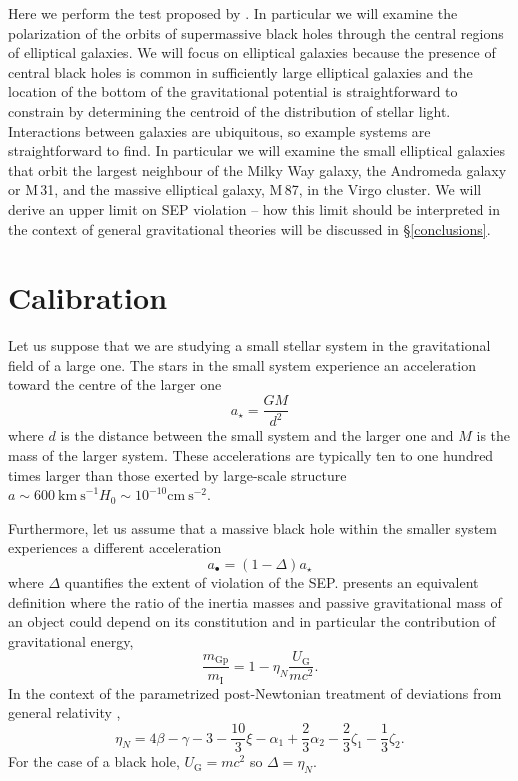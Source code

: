 \documentclass[useAMS,usenatbib]{mn2e}
\begin{document}
Here we perform the test proposed by \cite{2012PhRvL.109e1304H}.
In particular we will examine the polarization of the orbits of
supermassive black holes through the central regions of elliptical
galaxies.  We will focus on elliptical galaxies because the presence
of central black holes is common in sufficiently large elliptical
galaxies and the location of the bottom of the gravitational potential
is straightforward to constrain by determining the centroid of the
distribution of stellar light.  Interactions between galaxies are
ubiquitous, so example systems are straightforward to find.  In
particular we will examine the small elliptical galaxies that orbit
the largest neighbour of the Milky Way galaxy, the Andromeda galaxy or
M\,31, and the massive elliptical galaxy, M\,87, in the Virgo cluster.
We will derive an upper limit on SEP violation -- how this limit
should be interpreted in the context of general gravitational theories
will be discussed in \S \ref{conclusions}.

\section{Calibration}

Let us suppose that we are studying a small stellar system in the
gravitational field of a large one.  The stars in the small system
experience an acceleration toward the centre of the larger one
\begin{equation}
  a_\star = \frac{GM}{d^2}
  \label{eq:1}
\end{equation}
where $d$ is the distance between the small system and the larger one
and $M$ is the mass of the larger system.  These accelerations are
typically ten to one hundred times larger than those exerted by
large-scale structure $a \sim 600~\mathrm{km~s}^{-1} H_0 \sim 10^{-10}
\mathrm{cm~s}^{-2}$.

Furthermore, let us assume that a massive black hole within the
smaller system experiences a different acceleration
\begin{equation}
  a_\bullet = \left ( 1 - \Delta \right ) a_\star
  \label{eq:2}
\end{equation}
where $\Delta$ quantifies the extent of violation of the
SEP. \citet{1982RPPh...45..631N} presents an equivalent definition
where the ratio of the inertia masses and passive gravitational mass
of an object could depend on its constitution and in particular the
contribution of gravitational energy,
\begin{equation}
  \frac{m_\mathrm{Gp}}{m_\mathrm{I}} = 1- \eta_N \frac{U_\mathrm{G}}{mc^2}.
  \label{eq:3}
\end{equation}
In the context of the parametrized post-Newtonian treatment of
deviations from general relativity \citep{Will:lrr},
\begin{equation}
  \eta_{N} =4\beta - \gamma - 3 - \frac{10}{3} \xi - \alpha_1 +
  \frac{2}{3} \alpha_2 - \frac{2}{3} \zeta_1 - \frac{1}{3} \zeta_2.
  \label{eq:4}
\end{equation}
For the case of a black hole, $U_\mathrm{G} = mc^2$ so
$\Delta=\eta_N$. 
\end{document}
